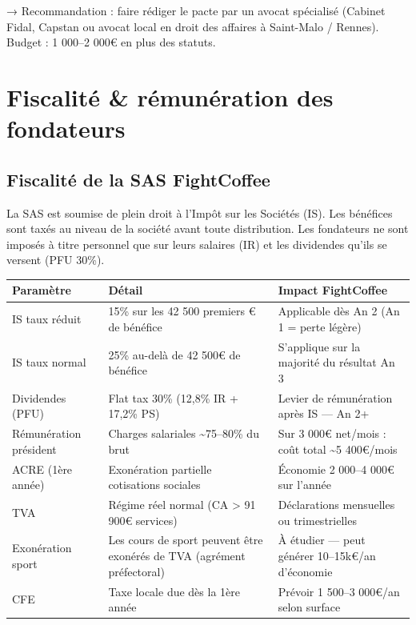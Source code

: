\documentclass[11pt, a4paper]{article}
\newcommand{\eyebrow}[1]{%
  \vspace{4pt}{\small\color{fc-ink3}\texttt{— #1}}\vspace{2pt}
}
\begin{document}
\begin{tipbox}
→ Recommandation : faire rédiger le pacte par un avocat spécialisé (Cabinet Fidal, Capstan ou avocat local en droit des affaires à Saint-Malo / Rennes). Budget : 1 000–2 000€ en plus des statuts.
\end{tipbox}

\section{Fiscalité \& rémunération des fondateurs}
\eyebrow{B — FISCALITÉ \& RÉMUNÉRATION}

\subsection{Fiscalité de la SAS FightCoffee}

La SAS est soumise de plein droit à l'Impôt sur les Sociétés (IS). Les bénéfices sont taxés au niveau de la société avant toute distribution. Les fondateurs ne sont imposés à titre personnel que sur leurs salaires (IR) et les dividendes qu'ils se versent (PFU 30\%).

\begin{center}
\begin{tabular}{@{}p{3.5cm}p{4.5cm}p{5cm}@{}}
\toprule
\rowcolor{fc-ink}\color{white}\textbf{Paramètre} & \color{white}\textbf{Détail} & \color{white}\textbf{Impact FightCoffee} \\
\midrule
IS taux réduit & 15\% sur les 42 500 premiers € de bénéfice & Applicable dès An 2 (An 1 = perte légère) \\
\rowcolor{fc-bg2} IS taux normal & 25\% au-delà de 42 500€ de bénéfice & S'applique sur la majorité du résultat An 3 \\
Dividendes (PFU) & Flat tax 30\% (12,8\% IR + 17,2\% PS) & Levier de rémunération après IS — An 2+ \\
\rowcolor{fc-bg2} Rémunération président & Charges salariales \textasciitilde75–80\% du brut & Sur 3 000€ net/mois : coût total \textasciitilde5 400€/mois \\
ACRE (1ère année) & Exonération partielle cotisations sociales & Économie 2 000–4 000€ sur l'année \\
\rowcolor{fc-bg2} TVA & Régime réel normal (CA > 91 900€ services) & Déclarations mensuelles ou trimestrielles \\
Exonération sport & Les cours de sport peuvent être exonérés de TVA (agrément préfectoral) & À étudier — peut générer 10–15k€/an d'économie \\
\rowcolor{fc-bg2} CFE & Taxe locale due dès la 1ère année & Prévoir 1 500–3 000€/an selon surface \\
\bottomrule
\end{tabular}
\end{center}
\end{document}
